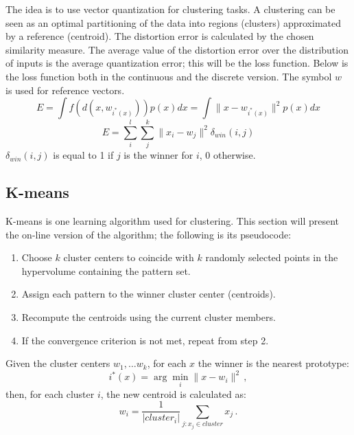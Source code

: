 The idea is to use vector quantization for clustering tasks. A clustering can be seen as an optimal partitioning of the data into regions (clusters) approximated by a reference (centroid). The distortion error is calculated by the chosen similarity measure. The average value of the distortion error over the distribution of inputs is the average quantization error; this will be the loss function. Below is the loss function both in the continuous and the discrete version. The symbol $w$ is used for reference vectors.
\begin{equation*}
    E = \int f(d(x, w_{i^*(x)})) p(x) dx = \int \|x - w_{i^*(x)}\|^2 p(x) dx
\end{equation*}
\begin{equation*}
    E = \sum_i^l \sum_j^k \|x_i - w_j \|^2 \delta_{win}(i,j)
\end{equation*}
$\delta_{win}(i,j)$ is equal to 1 if $j$ is the winner for $i$, 0 otherwise.

\subsection{K-means}

K-means is one learning algorithm used for clustering. This section will present the on-line version of the algorithm; the following is its pseudocode:
\begin{enumerate}
    \item Choose $k$ cluster centers to coincide with $k$ randomly selected points in the hypervolume containing the pattern set.

    \item Assign each pattern to the winner cluster center (centroids).

    \item Recompute the centroids using the current cluster members.

    \item If the convergence criterion is not met, repeat from step 2.
\end{enumerate}

Given the cluster centers $w_1, \dots w_k$, for each $x$ the winner is the nearest prototype:
\begin{equation*}
    i^*(x) = \arg \min_i \|x - w_i\|^2 \,,
\end{equation*}
then, for each cluster $i$, the new centroid is calculated as:
\begin{equation*}
    w_i = \dfrac{1}{|cluster_i|} \sum_{j : x_j \in cluster} x_j \,.
\end{equation*}

